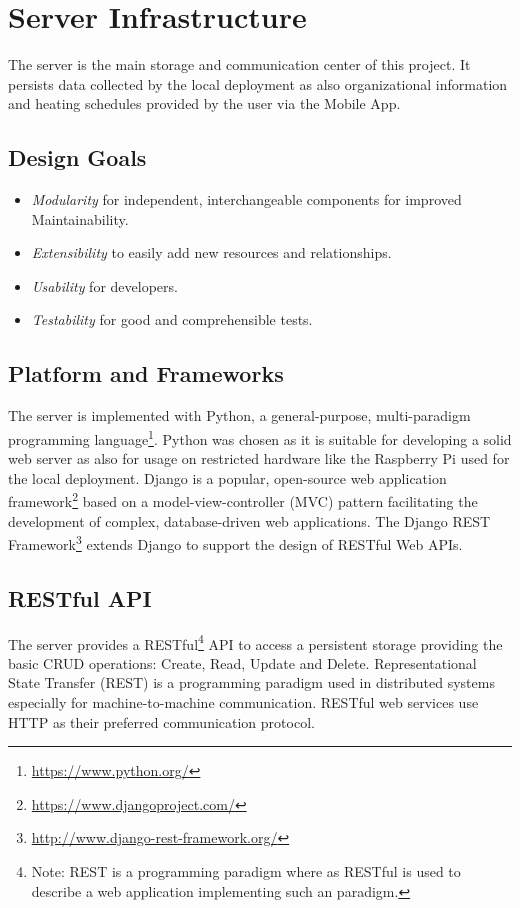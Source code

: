 
\section{Server Infrastructure}
\label{sec:server_infrastructure}

The server is the main storage and communication center of this project.
It persists data collected by the local deployment as also organizational information and heating schedules provided by the user via the Mobile App.

\subsection{Design Goals}

\begin{itemize}
\item \emph{Modularity} for independent, interchangeable components for improved Maintainability.
\item \emph{Extensibility} to easily add new resources and relationships.
\item \emph{Usability} for developers.
\item \emph{Testability} for good and comprehensible tests.
\end{itemize}

\subsection{Platform and Frameworks}

The server is implemented with Python, a general-purpose, multi-paradigm programming language\footnote{\url{https://www.python.org/}}.
Python was chosen as it is suitable for developing a solid web server as also for usage on restricted hardware like the Raspberry Pi used for the local deployment.
Django is a popular, open-source web application framework\footnote{\url{https://www.djangoproject.com/}} based on a model-view-controller (MVC) pattern facilitating the development of complex, database-driven web applications.
The Django REST Framework\footnote{\url{http://www.django-rest-framework.org/}} extends Django to support the design of RESTful Web APIs.

\subsection{RESTful API}

The server provides a RESTful\footnote{Note: REST is a programming paradigm where as RESTful is used to describe a web application implementing such an paradigm.} API to access a persistent storage providing the basic CRUD operations: Create, Read, Update and Delete.
Representational State Transfer (REST) is a programming paradigm used in distributed systems especially for machine-to-machine communication.
RESTful web services use HTTP as their preferred communication protocol.

